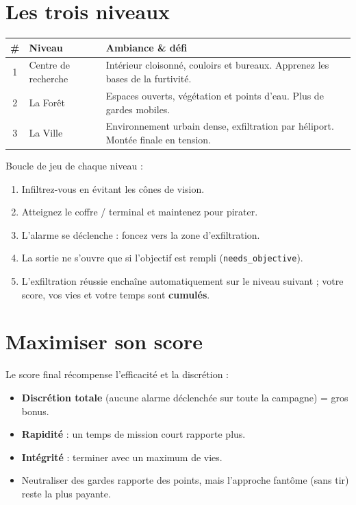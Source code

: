 \documentclass[11pt,a4paper]{article}
\newcommand{\code}[1]{\colorbox{codebg}{\texttt{#1}}}
\newcommand{\key}[1]{\fcolorbox{eclipsedark}{white}{\small\texttt{#1}}}
\begin{document}
\section{Les trois niveaux}
\begin{center}
\begin{tabular}{@{}clp{7.5cm}@{}}
\toprule
\textbf{\#} & \textbf{Niveau} & \textbf{Ambiance \&{} d\'efi} \\
\midrule
1 & Centre de recherche & Int\'erieur cloisonn\'e, couloirs et bureaux. Apprenez les bases de la furtivit\'e. \\
2 & La For\^et          & Espaces ouverts, v\'eg\'etation et points d'eau. Plus de gardes mobiles. \\
3 & La Ville            & Environnement urbain dense, exfiltration par h\'eliport. Mont\'ee finale en tension. \\
\bottomrule
\end{tabular}
\end{center}

\noindent Boucle de jeu de chaque niveau :
\begin{enumerate}[leftmargin=1.6em]
  \item Infiltrez-vous en \'evitant les c\^ones de vision.
  \item Atteignez le coffre / terminal et maintenez \key{E} pour pirater.
  \item L'alarme se d\'eclenche : foncez vers la zone d'exfiltration.
  \item La sortie ne s'ouvre que si l'objectif est rempli (\code{needs\_objective}).
  \item L'exfiltration r\'eussie encha\^ine automatiquement sur le niveau suivant ;
  votre score, vos vies et votre temps sont \textbf{cumul\'es}.
\end{enumerate}

\section{Maximiser son score}
Le score final r\'ecompense l'efficacit\'e et la discr\'etion :
\begin{itemize}[leftmargin=1.4em]
  \item \textbf{Discr\'etion totale} (aucune alarme d\'eclench\'ee sur toute la
  campagne) = gros bonus.
  \item \textbf{Rapidit\'e} : un temps de mission court rapporte plus.
  \item \textbf{Int\'egrit\'e} : terminer avec un maximum de vies.
  \item Neutraliser des gardes rapporte des points, mais l'approche
  \og{}fant\^ome\fg{} (sans tir) reste la plus payante.
\end{itemize}
\end{document}
